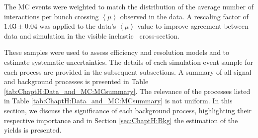 The MC events were weighted to match the distribution of the average number of interactions per bunch crossing \(\left<\mu \right>\) observed in the data. A rescaling factor of \(1.03\pm 0.04\) was applied to the data's $\left<\mu \right>$ value to improve agreement between data and simulation in the visible inelastic \pp\ cross-section\cite{STDM-2015-05}.

These samples were used to assess efficiency and resolution models and to estimate 
systematic uncertainties. The details of each simulation event sample for each process 
are provided in the subsequent subsections.
 A summary of all \tHq signal and background processes 
is presented in Table \ref{tab:ChaptH:Data_and_MC:MCsummary}. 
The relevance of the processes 
listed in Table \ref{tab:ChaptH:Data_and_MC:MCsummary} is not uniform.
 In this section,  we discuss the significance of each background process, highlighting their respective importance and in Section \ref{sec:ChaptH:Bkg} the estimation
 of the yields is presented.  




